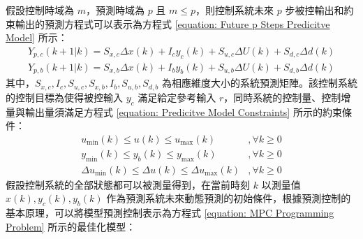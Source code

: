 假設控制時域為 $m$，預測時域為 $p$ 且 $m \leq p$，則控制系統未來 $p$ 步被控輸出和約束輸出的預測方程式可以表示為方程式 \eqref{equation: Future p Steps Predicitve Model} 所示：
%
\begin{equation}\label{equation: Future p Steps Predicitve Model}
  \begin{aligned}
    Y_{p, c} (k+1 | k) = S_{x, c} \Delta x(k) + I_{c} y_{c} (k) + S_{u, c} \Delta U(k) + S_{d, c} \Delta d(k) \\
    Y_{p, b} (k+1 | k) = S_{x, b} \Delta x(k) + I_{b} y_{b} (k) + S_{u, b} \Delta U(k) + S_{d, b} \Delta d(k)
  \end{aligned}
\end{equation}
%
其中，$S_{x, c}, I_{c}, S_{u, c}, S_{x, b}, I_{b}, S_{u, b}, S_{d, b}$ 為相應維度大小的系統預測矩陣。該控制系統的控制目標為使得被控輸入 $y_{c}$ 滿足給定參考輸入 $r$，同時系統的控制量、控制增量與輸出量須滿足方程式 \eqref{equation: Predicitve Model Constraints} 所示的約束條件：
%
\begin{equation}\label{equation: Predicitve Model Constraints}
  \begin{aligned}
    u_{\min} (k) \leq u(k) \leq u_{\max} (k)                      & , \forall k \geq 0 \\
    y_{\min} (k) \leq y_{b}(k) \leq y_{\max} (k)                  & , \forall k \geq 0 \\
    \Delta u_{\min} (k) \leq \Delta u(k) \leq \Delta u_{\max} (k) & , \forall k \geq 0
  \end{aligned}
\end{equation}
%
假設控制系統的全部狀態都可以被測量得到，在當前時刻 $k$ 以測量值 $x(k), y_{c}(k), y_{b}(k)$ 作為預測系統未來動態預測的初始條件，根據預測控制的基本原理，可以將模型預測控制表示為方程式 \eqref{equation: MPC Programming Problem} 所示的最佳化模型：
%
